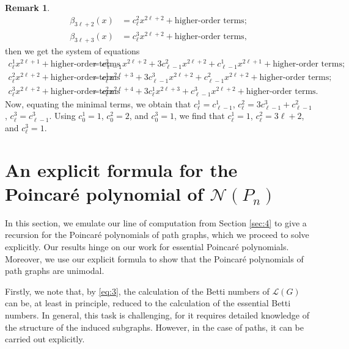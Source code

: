 \documentclass[12pt]{amsart}
\theoremstyle{definition}
\newtheorem{rem}[theorem]{Remark}
\begin{document}
\begin{rem}
\begin{align*}
    \beta_{3\ell+2}(x) &= c^{2}_\ell x^{2\ell+2} + \text{higher-order terms};\\
    \beta_{3\ell+3}(x) & = c^{3}_\ell x^{2\ell+2} + \text{higher-order terms},
    \end{align*}
    then we get the system of equations 
    \begin{align*}
    c^{1}_\ell x^{2\ell+1} + \text{higher-order terms}&= c^3_{\ell-1} x^{2\ell+2} + 3c^{2}_{\ell-1}x^{2\ell+2} + c^{1}_{\ell-1}x^{2\ell+1}+ \text{higher-order terms};\\
    c^2_\ell x^{2\ell+2} + \text{higher-order terms} &= c^1_{\ell}x^{2\ell+3} + 3 c^3_{\ell-1} x^{2\ell+2} + c^2_{\ell-1}x^{2\ell+2} + \text{higher-order terms};\\
    c^3_\ell x^{2\ell+2} + \text{higher-order terms} &= c^2_{\ell} x^{2\ell+4} + 3c^1_\ell x^{2\ell+3} + c^3_{\ell-1} x^{2\ell+2} + \text{higher-order terms}.
    \end{align*}
    Now, equating the minimal terms, we obtain that $c^1_\ell = c^1_{\ell-1}$, $c^2_\ell = 3 c^3_{\ell-1} + c^2_{\ell-1}$, $c^3_\ell = c^3_{\ell-1}$. Using $c^1_0 = 1$, $c^2_0 = 2$, and $c^3_0 = 1$, we find that $c^1_\ell = 1$, $c^2_\ell = 3\ell+2$, and $c^3_\ell = 1$.
\end{rem}

\section{An explicit formula for the Poincar\'e polynomial of $\mathcal N(P_n)$}\label{sec:5}
In this section, we emulate our line of computation from Section \ref{sec:4} to give a recursion for the Poincar\'e polynomials of path graphs, which we proceed to solve explicitly. Our results hinge on our work for essential Poincar\'e polynomials. Moreover, we use our explicit formula to show that the Poincar\'e polynomials of path graphs are unimodal.

Firstly, we note that, by \eqref{eq:3}, the calculation of the Betti numbers of $\mathcal L(G)$ can be, at least in principle, reduced to the calculation of the essential Betti numbers. In general, this task is challenging, for it requires detailed knowledge of the structure of the induced subgraphs. However, in the case of paths, it can be carried out explicitly. 
\end{document}
